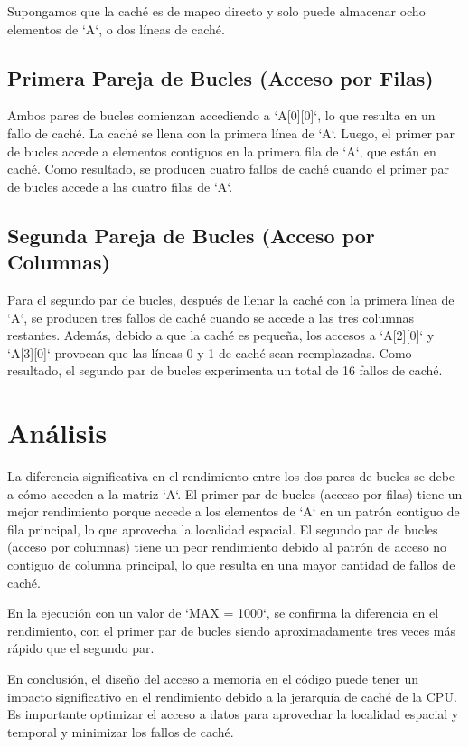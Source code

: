 Supongamos que la caché es de mapeo directo y solo puede almacenar ocho elementos de `A`, o dos líneas de caché.

\subsection{Primera Pareja de Bucles (Acceso por Filas)}
Ambos pares de bucles comienzan accediendo a `A[0][0]`, lo que resulta en un fallo de caché. La caché se llena con la primera línea de `A`. Luego, el primer par de bucles accede a elementos contiguos en la primera fila de `A`, que están en caché. Como resultado, se producen cuatro fallos de caché cuando el primer par de bucles accede a las cuatro filas de `A`.

\subsection{Segunda Pareja de Bucles (Acceso por Columnas)}
Para el segundo par de bucles, después de llenar la caché con la primera línea de `A`, se producen tres fallos de caché cuando se accede a las tres columnas restantes. Además, debido a que la caché es pequeña, los accesos a `A[2][0]` y `A[3][0]` provocan que las líneas 0 y 1 de caché sean reemplazadas. Como resultado, el segundo par de bucles experimenta un total de 16 fallos de caché.

\section{Análisis}
La diferencia significativa en el rendimiento entre los dos pares de bucles se debe a cómo acceden a la matriz `A`. El primer par de bucles (acceso por filas) tiene un mejor rendimiento porque accede a los elementos de `A` en un patrón contiguo de fila principal, lo que aprovecha la localidad espacial. El segundo par de bucles (acceso por columnas) tiene un peor rendimiento debido al patrón de acceso no contiguo de columna principal, lo que resulta en una mayor cantidad de fallos de caché.

En la ejecución con un valor de `MAX = 1000`, se confirma la diferencia en el rendimiento, con el primer par de bucles siendo aproximadamente tres veces más rápido que el segundo par.

En conclusión, el diseño del acceso a memoria en el código puede tener un impacto significativo en el rendimiento debido a la jerarquía de caché de la CPU. Es importante optimizar el acceso a datos para aprovechar la localidad espacial y temporal y minimizar los fallos de caché.
